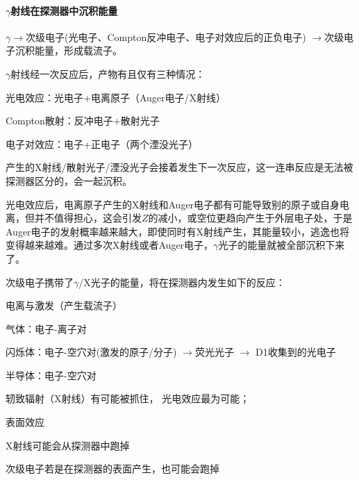 \paragraph{$\gamma$射线在探测器中沉积能量}
$\gamma\to$次级电子(光电子、Compton反冲电子、电子对效应后的正负电子) $\to$次级电子沉积能量，形成载流子。

$\gamma$射线经一次反应后，产物有且仅有三种情况：
\begin{compactitem}
	\item 光电效应：光电子+电离原子（Auger电子/X射线）
	\item Compton散射：反冲电子+散射光子
	\item 电子对效应：电子+正电子（两个湮没光子）
\end{compactitem}
产生的X射线/散射光子/湮没光子会接着发生下一次反应，这一连串反应是无法被探测器区分的，会一起沉积。

光电效应后，电离原子产生的X射线和Auger电子都有可能导致别的原子或自身电离，但并不值得担心，这会引发$Z$的减小，或空位更趋向产生于外层电子处，于是Auger电子的发射概率越来越大，即使同时有X射线产生，其能量较小，逃逸也将变得越来越难。通过多次X射线或者Auger电子，$\gamma$光子的能量就被全部沉积下来了。

次级电子携带了$\gamma$/X光子的能量，将在探测器内发生如下的反应：
\begin{compactitem}
	\item 电离与激发（产生载流子）
	\begin{compactitem}
		\item 气体：电子-离子对
		\item 闪烁体：电子-空穴对(激发的原子/分子) $\to$荧光光子%
		$\to$ D1收集到的光电子
		\item 半导体：电子-空穴对
	\end{compactitem}
	\item 轫致辐射（X射线）有可能被抓住，
	光电效应最为可能；
	\item 表面效应
	\begin{compactitem}
		\item X射线可能会从探测器中跑掉
		\item 次级电子若是在探测器的表面产生，也可能会跑掉
	\end{compactitem}
\end{compactitem}
